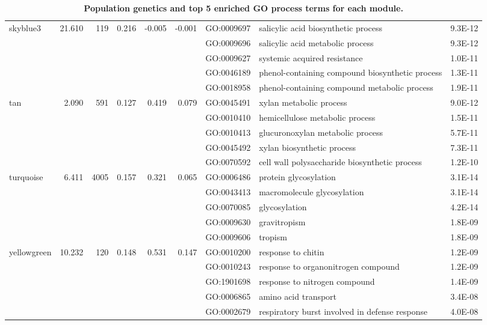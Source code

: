 \begin{landscape}
\begin{table}[ht]
\begin{tabular}{lrrrrrlP{5cm}r}
skyblue3 & 21.610 & 119 & 0.216 & -0.005 & -0.001 & GO:0009697 & salicylic acid biosynthetic process & 9.3E-12 \\ 
   &  &  &  &  &  & GO:0009696 & salicylic acid metabolic process & 9.3E-12 \\ 
   &  &  &  &  &  & GO:0009627 & systemic acquired resistance & 1.0E-11 \\ 
   &  &  &  &  &  & GO:0046189 & phenol-containing compound biosynthetic process & 1.3E-11 \\ 
   &  &  &  &  &  & GO:0018958 & phenol-containing compound metabolic process & 1.9E-11 \\ 
\hline 
 tan & 2.090 & 591 & 0.127 & 0.419 & 0.079 & GO:0045491 & xylan metabolic process & 9.0E-12 \\ 
   &  &  &  &  &  & GO:0010410 & hemicellulose metabolic process & 1.5E-11 \\ 
   &  &  &  &  &  & GO:0010413 & glucuronoxylan metabolic process & 5.7E-11 \\ 
   &  &  &  &  &  & GO:0045492 & xylan biosynthetic process & 7.3E-11 \\ 
   &  &  &  &  &  & GO:0070592 & cell wall polysaccharide biosynthetic process & 1.2E-10 \\ 
\hline  
turquoise & 6.411 & 4005 & 0.157 & 0.321 & 0.065 & GO:0006486 & protein glycosylation & 3.1E-14 \\ 
   &  &  &  &  &  & GO:0043413 & macromolecule glycosylation & 3.1E-14 \\ 
   &  &  &  &  &  & GO:0070085 & glycosylation & 4.2E-14 \\ 
   &  &  &  &  &  & GO:0009630 & gravitropism & 1.8E-09 \\ 
   &  &  &  &  &  & GO:0009606 & tropism & 1.8E-09 \\ 
\hline 
 yellowgreen & 10.232 & 120 & 0.148 & 0.531 & 0.147 & GO:0010200 & response to chitin & 1.2E-09 \\ 
   &  &  &  &  &  & GO:0010243 & response to organonitrogen compound & 1.2E-09 \\ 
   &  &  &  &  &  & GO:1901698 & response to nitrogen compound & 1.4E-09 \\ 
   &  &  &  &  &  & GO:0006865 & amino acid transport & 3.4E-08 \\ 
   &  &  &  &  &  & GO:0002679 & respiratory burst involved in defense response & 4.0E-08 \\ 
   \hline
\end{tabular}
\caption{\textbf{Population genetics and top 5 enriched GO process terms for each module.}}
\label{table:t1}
\end{table}

\end{landscape}

